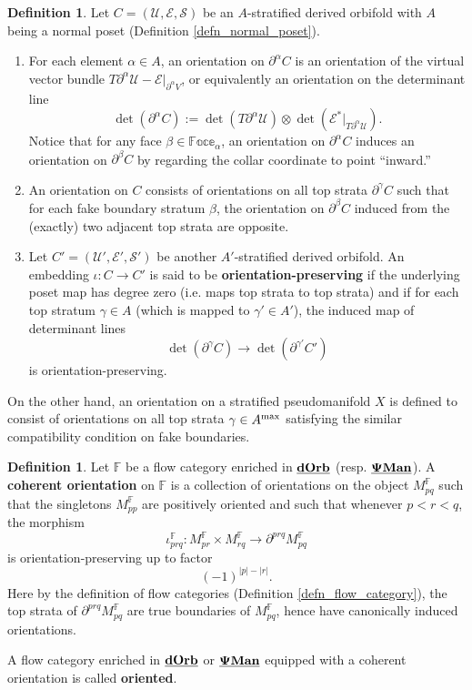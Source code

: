 \documentclass[reqno, 10pt]{amsart}
\numberwithin{equation}{section}
\numberwithin{equation}{section}
\theoremstyle{definition}
\newtheorem{defn}[thm]{Definition}
\theoremstyle{remark}
\newcommand{\beqn}{\begin{equation*}}
\newcommand{\eeqn}{\end{equation*}}
\newcommand{\mb}{\mathbb}
\newcommand{\mc}{\mathcal}
\newcommand{\pman}{\uds{{\bf \Psi}{\bf Man}}}
\newcommand{\uds}[1]{\underline{\smash{#1}}}
\begin{document}
\begin{defn}\label{defn711}
Let $C = ({\mc U}, {\mc E}, {\mc S})$ be an $A$-stratified derived orbifold with $A$ being a normal poset (Definition \ref{defn_normal_poset}).
\begin{enumerate}

\item For each element $\alpha \in A$, an orientation on $\partial^\alpha C$ is an orientation of the virtual vector bundle $T\partial^\alpha {\mc U} - {\mc E}|_{\partial^\alpha V}$, or equivalently an orientation on the determinant line 
\beqn
\det (\partial^\alpha C) := \det (T\partial^\alpha {\mc U}) \otimes \det ({\mc E}^*|_{T\partial^\alpha {\mc U}}).
\eeqn
Notice that for any face $\beta \in \mb{Face}_\alpha$, an orientation on $\partial^\alpha C$ induces an orientation on $\partial^\beta C$ by regarding the collar coordinate to point ``inward.''

\item An orientation on $C$ consists of orientations on all top strata $\partial^\gamma C$ such that for each fake boundary stratum $\beta$, the orientation on $\partial^\beta C$ induced from the (exactly) two adjacent top strata are opposite. 

\item Let $C' = ({\mc U}', {\mc E}', {\mc S}')$ be another $A'$-stratified derived orbifold. An embedding $\iota: C \to C'$ is said to be {\bf orientation-preserving} if the underlying poset map has degree zero (i.e. maps top strata to top strata) and if for each top stratum $\gamma \in A$ (which is mapped to $\gamma'\in A'$), the induced map of determinant lines
\beqn
\det (\partial^\gamma C) \to \det (\partial^{\gamma'} C')
\eeqn
is orientation-preserving.
\end{enumerate}
\end{defn}

On the other hand, an orientation on a stratified pseudomanifold $X$ is defined to consist of orientations on all top strata $\gamma \in A^{\rm max}$ satisfying the similar compatibility condition on fake boundaries. 


\begin{defn}\label{defn_coherent_orientation}
Let ${\mb F}$ be a flow category enriched in $\uds{\bf dOrb}$ (resp. $\pman$). A {\bf coherent orientation} on ${\mb F}$ is a collection of orientations on the object $M_{pq}^{\mb F}$ such that the singletons $M_{pp}^{\mb F}$ are positively oriented and such that whenever $p< r < q$, the morphism
\beqn
\iota_{prq}^{\mb F}: M_{pr}^{\mb F} \times M_{rq}^{\mb F} \to \partial^{prq} M_{pq}^{\mb F}
\eeqn
is orientation-preserving up to factor
\beqn
(-1)^{|p|- |r|}.
\eeqn
Here by the definition of flow categories (Definition \ref{defn_flow_category}), the top strata of $\partial^{prq} M_{pq}^{\mb F}$ are true boundaries of $M_{pq}^{\mb F}$, hence have canonically induced orientations.

A flow category enriched in $\uds{\bf dOrb}$ or $\pman$ equipped with a coherent orientation is called {\bf oriented}.
\end{defn}
\end{document}
